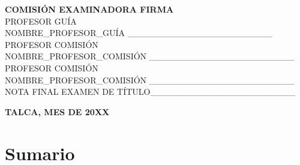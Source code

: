 \documentclass[headings=optiontohead,12pt,letterpaper,oneside,spanish]{book}
\begin{document}
    \textbf{COMISIÓN EXAMINADORA \hfill FIRMA}\hspace*{2cm}\\

    PROFESOR GUÍA \hfill \\
    NOMBRE\_PROFESOR\_GUÍA \hfill \_\_\_\_\_\_\_\_\_\_\_\_\_\_\_\_\_\_\_\_\_\_\_ \\

    PROFESOR COMISIÓN \hfill \\
    NOMBRE\_PROFESOR\_COMISIÓN \hfill \_\_\_\_\_\_\_\_\_\_\_\_\_\_\_\_\_\_\_\_\_\_\_ \\

    PROFESOR COMISIÓN \hfill \\
    NOMBRE\_PROFESOR\_COMISIÓN \hfill \_\_\_\_\_\_\_\_\_\_\_\_\_\_\_\_\_\_\_\_\_\_\_ \\

    NOTA FINAL EXAMEN DE TÍTULO\hfill \_\_\_\_\_\_\_\_\_\_\_\_\_\_\_\_\_\_\_\_\_\_\_ \\

\vfill

\begin{center}
\textbf{TALCA, MES DE 20XX}
\end{center}




\newpage








\chapter*{Sumario}
\end{document}
